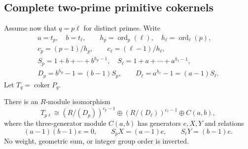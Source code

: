 \subsection{Complete two-prime primitive cokernels}

Assume now that $q=p\ell$ for distinct primes. Write
\begin{equation}\label{intdist:eq:two-prime-notation}
 \begin{gathered}
 a=t_p,\quad b=t_\ell,\qquad
 h_p=\operatorname{ord}_{p}(\ell),\quad
 h_\ell=\operatorname{ord}_{\ell}(p),\\
 c_p=(p-1)/h_p,\qquad c_\ell=(\ell-1)/h_\ell,\\
 S_p=1+b+\cdots+b^{h_p-1},\quad
 S_\ell=1+a+\cdots+a^{h_\ell-1},\\
 D_p=b^{h_p}-1=(b-1)S_p,\qquad
 D_\ell=a^{h_\ell}-1=(a-1)S_\ell.
 \end{gathered}
\end{equation}
Let $T_q=\operatorname{coker}P_q$.

\begin{theorem}
\label{intdist:thm:two-prime}
There is an $R$-module isomorphism
\begin{equation}\label{intdist:eq:cokernel}
 T_{p\ell}\cong
 (R/(D_p))^{c_p-1}\oplus(R/(D_\ell))^{c_\ell-1}
 \oplus C(a,b),
\end{equation}
where the three-generator module $C(a,b)$ has generators $e,X,Y$ and
relations
\begin{equation}\label{intdist:eq:core}
 (a-1)(b-1)e=0,\qquad
 S_pX=(a-1)e,\qquad
 S_\ell Y=(b-1)e.
\end{equation}
No weight, geometric sum, or integer group order is inverted.
\end{theorem}

